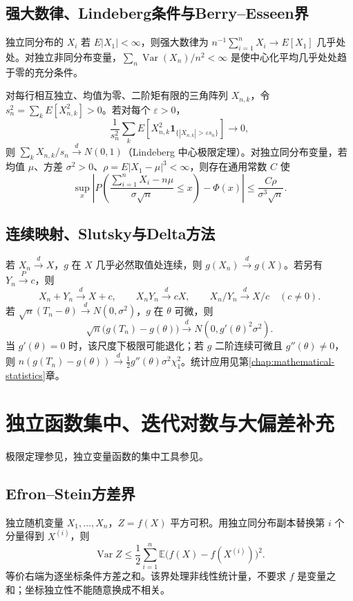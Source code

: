 \documentclass[../main.tex]{subfiles}
\begin{document}
\subsection{强大数律、Lindeberg条件与Berry--Esseen界}
独立同分布的 $X_i$ 若 $E|X_1|<\infty$，则强大数律为 $n^{-1}\sum_{i=1}^nX_i\to E[X_1]$ 几乎处处。对独立非同分布变量，$\sum_n\operatorname{Var}(X_n)/n^2<\infty$ 是使中心化平均几乎处处趋于零的充分条件。

对每行相互独立、均值为零、二阶矩有限的三角阵列 $X_{n,k}$，令 $s_n^2=\sum_kE[X_{n,k}^2]>0$。若对每个 $\varepsilon>0$，
\[
\frac1{s_n^2}\sum_kE\!\left[X_{n,k}^2\mathbf1_{\{|X_{n,k}|>\varepsilon s_n\}}\right]\to0,
\]
则 $\sum_kX_{n,k}/s_n\xrightarrow d N(0,1)$（Lindeberg 中心极限定理）。对独立同分布变量，若均值 $\mu$、方差 $\sigma^2>0$、$\rho=E|X_1-\mu|^3<\infty$，则存在通用常数 $C$ 使
\[
\sup_x\left|P\!\left(\frac{\sum_{i=1}^nX_i-n\mu}{\sigma\sqrt n}\le x\right)-\Phi(x)\right|
\le\frac{C\rho}{\sigma^3\sqrt n}.
\]

\subsection{连续映射、Slutsky与Delta方法}
若 $X_n\xrightarrow d X$，$g$ 在 $X$ 几乎必然取值处连续，则 $g(X_n)\xrightarrow d g(X)$。若另有 $Y_n\xrightarrow P c$，则
\[
X_n+Y_n\xrightarrow d X+c,\qquad X_nY_n\xrightarrow d cX,\qquad
X_n/Y_n\xrightarrow d X/c\quad(c\ne0).
\]
若 $\sqrt n(T_n-\theta)\xrightarrow d N(0,\sigma^2)$，$g$ 在 $\theta$ 可微，则
\[
\sqrt n\bigl(g(T_n)-g(\theta)\bigr)\xrightarrow d N(0,g'(\theta)^2\sigma^2).
\]
当 $g'(\theta)=0$ 时，该尺度下极限可能退化；若 $g$ 二阶连续可微且 $g''(\theta)\ne0$，则 $n(g(T_n)-g(\theta))\xrightarrow d \tfrac12g''(\theta)\sigma^2\chi_1^2$。统计应用见第\ref{chap:mathematical-statistics}章。
\section{独立函数集中、迭代对数与大偏差补充}
极限定理参见\cite{durrett}，独立变量函数的集中工具参见\cite{massart}。
\subsection{Efron--Stein方差界}
独立随机变量 $X_1,\ldots,X_n$，$Z=f(X)$ 平方可积。用独立同分布副本替换第 $i$ 个分量得到 $X^{(i)}$，则
\[
\operatorname{Var}Z\le\frac12\sum_{i=1}^n
\mathbb E\bigl(f(X)-f(X^{(i)})\bigr)^2.
\]
等价右端为逐坐标条件方差之和。该界处理非线性统计量，不要求 $f$ 是变量之和；坐标独立性不能随意换成不相关。
\end{document}

